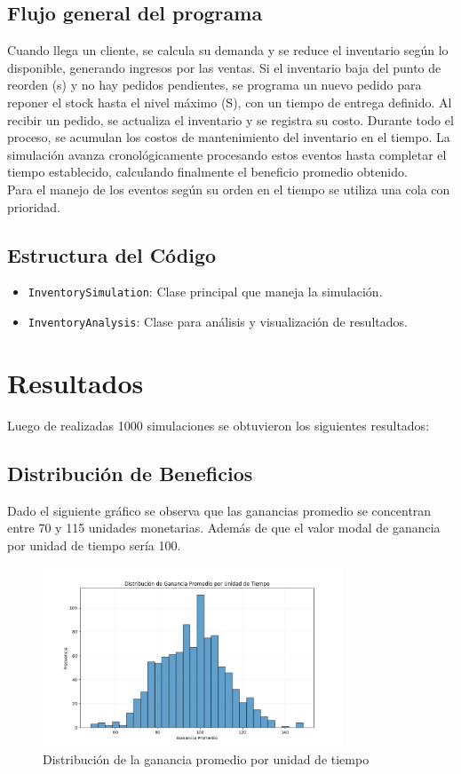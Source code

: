 \documentclass{article}
\begin{document}
\subsection{Flujo general del programa}
Cuando llega un cliente, se calcula su demanda y se reduce el inventario según lo disponible, generando ingresos por las ventas. 
Si el inventario baja del punto de reorden (s) y no hay pedidos pendientes, se programa un nuevo pedido para reponer el stock 
hasta el nivel máximo (S), con un tiempo de entrega definido. Al recibir un pedido, se actualiza el inventario y se registra su costo. 
Durante todo el proceso, se acumulan los costos de mantenimiento del inventario en el tiempo. La simulación avanza cronológicamente 
procesando estos eventos hasta completar el tiempo establecido, calculando finalmente el beneficio promedio obtenido.\\
Para el manejo de los eventos según su orden en el tiempo se utiliza una cola con prioridad.

\subsection{Estructura del Código}
\begin{itemize}
    \item \texttt{InventorySimulation}: Clase principal que maneja la simulación.
    \item \texttt{InventoryAnalysis}: Clase para análisis y visualización de resultados.
\end{itemize}

\newpage
\section{Resultados}

Luego de realizadas 1000 simulaciones se obtuvieron los siguientes resultados:
\subsection{Distribución de Beneficios}
Dado el siguiente gráfico se observa que las ganancias promedio se concentran entre 70 y 115 unidades monetarias. Además de que el valor modal de ganancia por unidad de tiempo
sería 100.

\begin{figure}[h]
    \centering
    \includegraphics[width=0.8\textwidth]{images/Ganancia promedio por unidad de tiempo.png}
    \caption{Distribución de la ganancia promedio por unidad de tiempo}
\end{figure}
\end{document}
